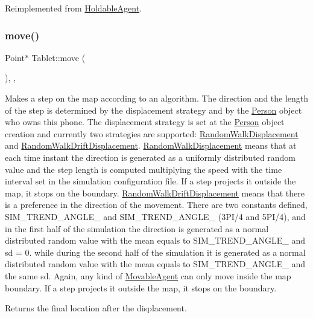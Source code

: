 Reimplemented from \mbox{\hyperlink{class_holdable_agent_ab330bb40de51a957ef8826af629f94a2}{Holdable\+Agent}}.

\mbox{\label{class_tablet_ab1b8c7591be0c6ea118c8ab1c17839bb}} 
\subsubsection{\texorpdfstring{move()}{move()}}
{\footnotesize\ttfamily Point$\ast$ Tablet\+::move (\begin{DoxyParamCaption}{ }\end{DoxyParamCaption})\hspace{0.3cm}{\ttfamily [inline]}, {\ttfamily [override]}, {\ttfamily [virtual]}}

Makes a step on the map according to an algorithm. The direction and the length of the step is determined by the displacement strategy and by the \mbox{\hyperlink{class_person}{Person}} object who owns this phone. The displacement strategy is set at the \mbox{\hyperlink{class_person}{Person}} object creation and currently two strategies are supported\+: \mbox{\hyperlink{class_random_walk_displacement}{Random\+Walk\+Displacement}} and \mbox{\hyperlink{class_random_walk_drift_displacement}{Random\+Walk\+Drift\+Displacement}}. \mbox{\hyperlink{class_random_walk_displacement}{Random\+Walk\+Displacement}} means that at each time instant the direction is generated as a uniformly distributed random value and the step length is computed multiplying the speed with the time interval set in the simulation configuration file. If a step projects it outside the map, it stops on the boundary. \mbox{\hyperlink{class_random_walk_drift_displacement}{Random\+Walk\+Drift\+Displacement}} means that there is a preference in the direction of the movement. There are two constants defined, S\+I\+M\+\_\+\+T\+R\+E\+N\+D\+\_\+\+A\+N\+G\+L\+E\+\_ and S\+I\+M\+\_\+\+T\+R\+E\+N\+D\+\_\+\+A\+N\+G\+L\+E\+\_ (3P\+I/4 and 5P\+I/4), and in the first half of the simulation the direction is generated as a normal distributed random value with the mean equals to S\+I\+M\+\_\+\+T\+R\+E\+N\+D\+\_\+\+A\+N\+G\+L\+E\+\_ and sd = 0. while during the second half of the simulation it is generated as a normal distributed random value with the mean equals to S\+I\+M\+\_\+\+T\+R\+E\+N\+D\+\_\+\+A\+N\+G\+L\+E\+\_ and the same sd. Again, any kind of \mbox{\hyperlink{class_movable_agent}{Movable\+Agent}} can only move inside the map boundary. If a step projects it outside the map, it stops on the boundary. \begin{DoxyReturn}{Returns}
the final location after the displacement. 
\end{DoxyReturn}


